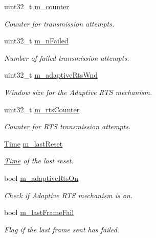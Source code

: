 \begin{DoxyCompactItemize}
\item 
uint32\+\_\+t \hyperlink{structns3_1_1RraaWifiRemoteStation_a4ffb57dc3c6e3dfa5120d5b96e9d33ed}{m\+\_\+counter}
\begin{DoxyCompactList}\small\item\em Counter for transmission attempts. \end{DoxyCompactList}\item 
uint32\+\_\+t \hyperlink{structns3_1_1RraaWifiRemoteStation_ad9920f0ba5de7d612c7b564e553e3045}{m\+\_\+n\+Failed}
\begin{DoxyCompactList}\small\item\em Number of failed transmission attempts. \end{DoxyCompactList}\item 
uint32\+\_\+t \hyperlink{structns3_1_1RraaWifiRemoteStation_aa08bbae02d96d903c975ead8b68efe30}{m\+\_\+adaptive\+Rts\+Wnd}
\begin{DoxyCompactList}\small\item\em Window size for the Adaptive R\+TS mechanism. \end{DoxyCompactList}\item 
uint32\+\_\+t \hyperlink{structns3_1_1RraaWifiRemoteStation_a5693e78f4b3f58b134103bd743f27a5e}{m\+\_\+rts\+Counter}
\begin{DoxyCompactList}\small\item\em Counter for R\+TS transmission attempts. \end{DoxyCompactList}\item 
\hyperlink{classns3_1_1Time}{Time} \hyperlink{structns3_1_1RraaWifiRemoteStation_a318df9a99bc7895923b6ee7024bdf94b}{m\+\_\+last\+Reset}
\begin{DoxyCompactList}\small\item\em \hyperlink{classns3_1_1Time}{Time} of the last reset. \end{DoxyCompactList}\item 
bool \hyperlink{structns3_1_1RraaWifiRemoteStation_abae3a71d995dac8fc4e0f3bf4074d79e}{m\+\_\+adaptive\+Rts\+On}
\begin{DoxyCompactList}\small\item\em Check if Adaptive R\+TS mechanism is on. \end{DoxyCompactList}\item 
bool \hyperlink{structns3_1_1RraaWifiRemoteStation_ab0907d37748a2f9a636a9a9b366d517d}{m\+\_\+last\+Frame\+Fail}
\begin{DoxyCompactList}\small\item\em Flag if the last frame sent has failed. \end{DoxyCompactList}\item 

\end{DoxyCompactItemize}
